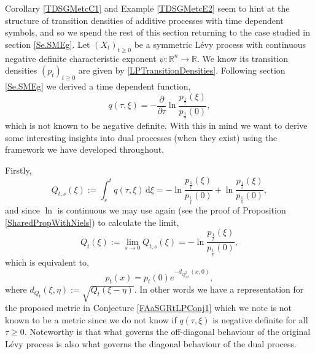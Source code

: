 \documentclass[a4paper, 12pt]{report}
\theoremstyle{remark}
\theoremstyle{definition}
\begin{document}
Corollary \ref{TDSGMetcC1} and Example \ref{TDSGMetcE2} seem to hint at the structure of transition densities of additive processes with time dependent symbols, and so we spend the rest of this section returning to the case studied in section \ref{Se.SMEg}.  Let $(X_t)_{t \ge 0}$ be a symmetric L\'evy process with continuous negative definite characteristic exponent $\psi : \mathbb{R}^n \to \mathbb{R}$.  We know its transition densities $(p_t)_{t \ge 0}$ are given by \eqref{LPTransitionDensities}.  Following section \ref{Se.SMEg} we derived a time dependent function,
$$
q(\tau, \xi) = -\frac{\partial}{\partial\tau}\ln\frac{p_\frac{1}{\tau}(\xi)}{p_\frac{1}{\tau}(0)},
$$
which is not known to be negative definite.  With this in mind we want to derive some interesting insights into dual processes (when they exist) using the framework we have developed throughout.

Firstly,
$$
Q_{t, s}(\xi) := \int_s^tq(\tau, \xi)\,\mathrm{d}\xi = -\ln\frac{p_\frac{1}{t}(\xi)}{p_\frac{1}{t}(0)} + \ln\frac{p_\frac{1}{s}(\xi)}{p_\frac{1}{s}(0)},
$$
and since $\ln$ is continuous we may use \cite[Theorem 14]{DProofPaper} again (see the proof of Proposition \ref{SharedPropWithNiels}) to calculate the limit,
$$
Q_t(\xi) := \lim_{s \to 0}Q_{t, s}(\xi) = -\ln\frac{p_\frac{1}{t}(\xi)}{p_\frac{1}{t}(0)},
$$
which is equivalent to,
$$
p_t(x) = p_t(0)e^{-d_{Q_{1/t}^2}(x, 0)},
$$
where $d_{Q_t}(\xi, \eta) := \sqrt{Q_t(\xi - \eta)}$.  In other words we have a representation for the proposed metric in Conjecture \ref{FAaSGRtLPConj1} which we note is not known to be a metric since we do not know if $q(\tau, \xi)$ is negative definite for all $\tau \ge 0$.  Noteworthy is that what governs the off-diagonal behaviour of the original L\'evy process is also what governs the diagonal behaviour of the dual process.
\end{document}
